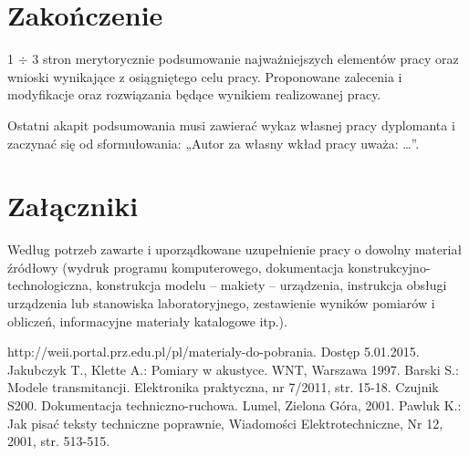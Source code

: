 \documentclass[12pt,twoside]{article}
\begin{document}
\clearpage

\section{Zakończenie}

1 $\div$ 3 stron merytorycznie podsumowanie najważniejszych elementów pracy oraz wnioski wynikające z osiągniętego celu pracy. Proponowane zalecenia i modyfikacje oraz rozwiązania będące wynikiem realizowanej pracy.

Ostatni akapit podsumowania musi zawierać wykaz własnej pracy dyplomanta i zaczynać się od sformułowania: „Autor za własny wkład pracy uważa: \ldots”.

\clearpage

\section*{Załączniki}

Według potrzeb zawarte i uporządkowane uzupełnienie pracy o dowolny materiał źródłowy (wydruk programu komputerowego, dokumentacja kons\-truk\-cyj\-no-\-tech\-no\-lo\-gicz\-na, konstrukcja modelu -- makiety -- urządzenia, instrukcja obsługi urządzenia lub stanowiska laboratoryjnego, zestawienie wyników pomiarów i obliczeń, informacyjne materiały katalogowe itp.).


\clearpage


\begin{thebibliography}{4}
 http://weii.portal.prz.edu.pl/pl/materialy-do-pobrania. Dostęp 5.01.2015.
 Jakubczyk T., Klette A.: Pomiary w akustyce. WNT, Warszawa 1997.
 Barski S.: Modele transmitancji. Elektronika praktyczna, nr 7/2011, str. 15-18.
 Czujnik S200. Dokumentacja techniczno-ruchowa. Lumel, Zielona Góra, 2001.
 Pawluk K.: Jak pisać teksty techniczne poprawnie, Wiadomości Elektrotechniczne, Nr 12, 2001, str. 513-515.
\end{thebibliography}

\clearpage

\makesummary
\end{document}
